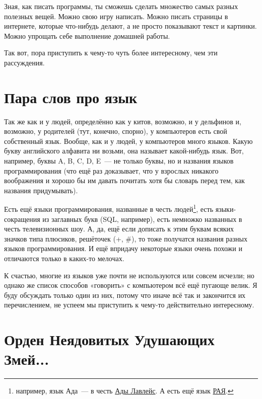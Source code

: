 Зная, как писать программы, ты сможешь сделать множество самых разных полезных вещей. Можно свою игру написать. Можно писать страницы в интернете, которые что-нибудь делают, а не просто показывают текст и картинки. Можно упрощать себе выполнение домашней работы.

Так вот, пора приступить к чему-то чуть более интересному, чем эти рассуждения.

\section{Пара слов про язык}

Так же как и у людей, определённо как у китов, возможно, и у дельфинов и, возможно, у родителей (тут, конечно, спорно), у компьютеров есть свой собственный язык. Вообще, как и у людей, у компьютеров много языков. Какую букву английского алфавита ни возьми, она называет какой-нибудь язык. Вот, например, буквы A, B, C, D, E — не только буквы, но и названия языков программирования (что ещё раз доказывает, что у взрослых никакого воображения и хорошо бы им давать почитать хотя бы словарь перед тем, как названия придумывать).

Есть ещё языки программирования, названные в честь людей\footnote{например, язык Ада — в честь \href{https://ru.wikipedia.org/wiki/\%D0\%9B\%D0\%B0\%D0\%B2\%D0\%BB\%D0\%B5\%D0\%B9\%D1\%81,_\%D0\%90\%D0\%B4\%D0\%B0}{Ады Лавлейс}. А есть ещё язык \href{https://ru.wikipedia.org/wiki/\%D0\%A3\%D1\%87\%D0\%B5\%D0\%B1\%D0\%BD\%D1\%8B\%D0\%B9_\%D0\%B0\%D0\%BB\%D0\%B3\%D0\%BE\%D1\%80\%D0\%B8\%D1\%82\%D0\%BC\%D0\%B8\%D1\%87\%D0\%B5\%D1\%81\%D0\%BA\%D0\%B8\%D0\%B9_\%D1\%8F\%D0\%B7\%D1\%8B\%D0\%BA}{РАЯ}.},
есть языки-сокращения из заглавных букв (SQL, например),  есть немножко названных в честь телевизионных шоу. А, да, ещё если дописать к этим буквам всяких значков типа плюсиков, решёточек (+, \#), то тоже получатся названия разных языков программирования. И ещё впридачу некоторые языки очень похожи и отличаются только в каких-то мелочах.


К счастью, многие из языков уже почти не используются или совсем исчезли; но однако же список способов «говорить» с компьютером всё ещё пугающе велик. Я буду обсуждать только один из них, потому что иначе всё так и закончится их перечислением, не успеем мы приступить к чему-то действительно интересному.

\section{Орден Неядовитых Удушающих Змей...}

